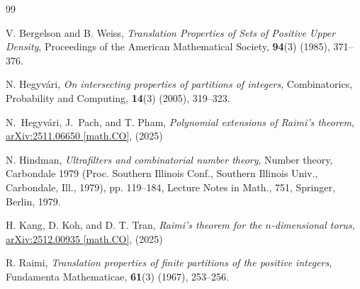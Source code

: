 \documentclass[11pt]{article}
\numberwithin{equation}{section}
\theoremstyle{remark}
\begin{document}
\begin{thebibliography}{99}


 V. Bergelson and B. Weiss, \textit{Translation Properties of Sets of Positive Upper Density}, Proceedings of the American Mathematical Society, \textbf{94}(3) (1985), 371--376.

 N. Hegyv\'ari, 
\textit{On intersecting properties of partitions of integers},
Combinatorics, Probability and Computing, \textbf{14}(3) (2005), 319--323.

N.~Hegy\-v\'{a}ri, J.~Pach, and T. Pham,
\textit{Polynomial extensions of Raimi's theorem}, 
\href{https://arxiv.org/abs/2511.06650}{arXiv:2511.06650 [math.CO]}, (2025)

 N. Hindman, \textit{Ultrafilters and combinatorial number theory}, Number theory, Carbondale 1979 (Proc. Southern Illinois Conf., Southern Illinois Univ., Carbondale, Ill., 1979),  pp. 119--184, Lecture Notes in Math., 751, Springer, Berlin, 1979.

 H. Kang, D. Koh, and D. T. Tran, \textit{Raimi's theorem for the $n$-dimensional torus}, 
\href{https://arxiv.org/abs/2512.00935}
{arXiv:2512.00935 [math.CO]}, (2025)

  R. Raimi, \textit{Translation properties of finite partitions of the positive integers}, Fundamenta Mathematicae, \textbf{61}(3) (1967), 253--256.
\end{thebibliography}
\end{document}
